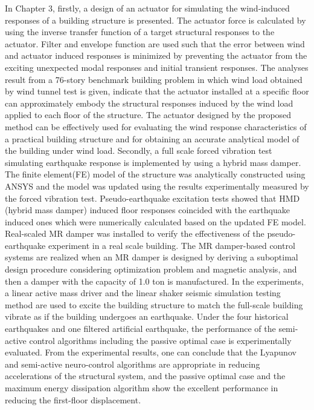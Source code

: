 In Chapter 3, firstly, a design of an actuator for simulating the wind-induced responses of a building structure is presented. The actuator force is calculated by using the inverse transfer function of a target structural responses to the actuator. Filter and envelope function are used such that the error between wind and actuator induced responses is minimized by preventing the actuator from the exciting unexpected modal responses and initial transient responses. The analyses result from a 76-story benchmark building problem in which wind load obtained by wind tunnel test is given, indicate that the actuator installed at a specific floor can approximately embody the structural responses induced by the wind load applied to each floor of the structure. The actuator designed by the proposed method can be effectively used for evaluating the wind response characteristics of a practical building structure and for obtaining an accurate analytical model of the building under wind load. Secondly, a full scale forced vibration test simulating earthquake response is implemented by using a hybrid mass damper. The finite element(FE) model of the structure was analytically constructed using ANSYS and the model was updated using the results experimentally measured by the forced vibration test. Pseudo-earthquake excitation tests showed that HMD (hybrid mass damper) induced floor responses coincided with the earthquake induced ones which were numerically calculated based on the updated FE model. Real-scaled MR damper was installed to verify the effectiveness of the pseudo-earthquake experiment in a real scale building. The MR damper-based control systems are realized when an MR damper is designed by deriving a suboptimal design procedure considering optimization problem and magnetic analysis, and then a damper with the capacity of 1.0 ton is manufactured. In the experiments, a linear active mass driver and the linear shaker seismic simulation testing method are used to excite the building structure to match the full-scale building vibrate as if the building undergoes an earthquake. Under the four historical earthquakes and one filtered artificial earthquake, the performance of the semi-active control algorithms including the passive optimal case is experimentally evaluated. From the experimental results, one can conclude that the Lyapunov and semi-active neuro-control algorithms are appropriate in reducing accelerations of the structural system, and the passive optimal case and the maximum energy dissipation algorithm show the excellent performance in reducing the first-floor displacement.

